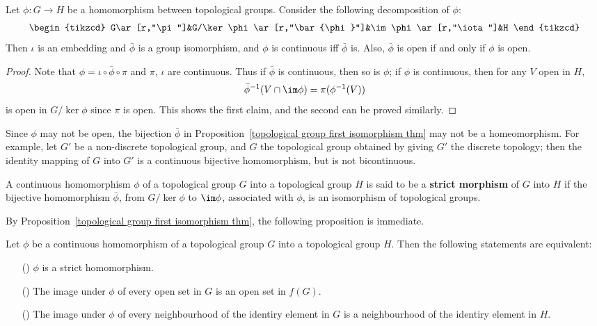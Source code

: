 \begin{proposition}\label{topological group first isomorphism thm}
Let $\phi:G\to H$ be a homomorphism between topological groups. Consider the following decomposition of $\phi$:
\[\begin{tikzcd}
G\ar[r,"\pi"]&G/\ker\phi\ar[r,"\bar{\phi}"]&\im\phi\ar[r,"\iota"]&H
\end{tikzcd}\]
Then $\iota$ is an embedding and $\bar{\phi}$ is a group isomorphism, and $\phi$ is continuous iff $\bar{\phi}$ is. Also, $\bar{\phi}$ is open if and only if $\phi$ is open.
\end{proposition}
\begin{proof}
Note that $\phi=\iota\circ\bar{\phi}\circ\pi$ and $\pi$, $\iota$ are continuous. Thus if $\bar{\phi}$ is continuous, then so is $\phi$; if $\phi$ is continuous, then for any $V$ open in $H$,
\[\bar{\phi}^{-1}(V\cap\im\phi)=\pi(\phi^{-1}(V))\]
is open in $G/\ker\phi$ since $\pi$ is open. This shows the first claim, and the second can be proved similarly.
\end{proof}
Since $\phi$ may not be open, the bijection $\bar{\phi}$ in Proposition~\ref{topological group first isomorphism thm} may not be a homeomorphism. For example, let $G'$ be a non-discrete topological group, and $G$ the topological group obtained by giving $G'$ the discrete topology; then the identity mapping of $G$ into $G'$ is a continuous bijective homomorphism, but is not bicontinuous.
\begin{definition}
A continuous homomorphism $\phi$ of a topological group $G$ into a topological group $H$ is said to be a \textbf{strict morphism} of $G$ into $H$ if the bijective homomorphism $\bar{\phi}$, from $G/\ker\phi$ to $\im\phi$, associated with $\phi$, is an isomorphism of topological groups.
\end{definition}
By Proposition~\ref{topological group first isomorphism thm}, the following proposition is immediate.
\begin{proposition}\label{topological group stric morphism iff}
Let $\phi$ be a continuous homomorphism of a topological group $G$ into a topological group $H$. Then the following statements are equivalent:
\begin{itemize}
\item[(\rmnum{1})] $\phi$ is a strict homomorphism. 
\item[(\rmnum{2})] The image under $\phi$ of every open set in $G$ is an open set in $f(G)$.
\item[(\rmnum{3})] The image under $\phi$ of every neighbourhood of the identiry element in $G$ is a neighbourhood of the identiry element in $H$.  
\end{itemize}
\end{proposition}
